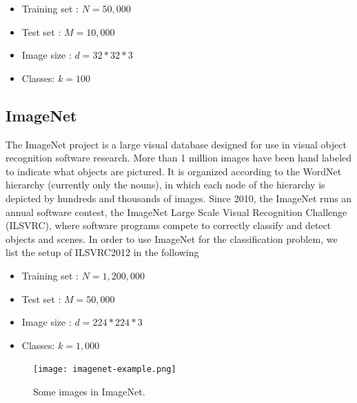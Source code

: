 {\begin{itemize}
	\item Training set : $N = 50,000$
	\item Test set : $M = 10,000$
	\item Image size : $d = 32*32*3$
	\item Classes: $k = 100$
	\end{itemize}

\subsection{ImageNet}
The ImageNet\cite{deng2009imagenet} project is a large visual database designed for use in visual object recognition software research. More than 1 million images have been hand labeled to indicate what objects are pictured. It is organized according to the WordNet hierarchy (currently only the nouns), in which each node of the hierarchy is depicted by hundreds and thousands of images.
Since 2010, the ImageNet runs an annual software contest, the ImageNet Large Scale Visual Recognition Challenge (ILSVRC), where software programs compete to correctly classify and detect objects and scenes. In order to use ImageNet for the classification problem, we list the setup of ILSVRC2012 in the following
\begin{itemize}
	\item Training set : $N = 1,200,000$
	\item Test set : $M = 50,000$
	\item Image size : $d = 224*224*3$
	\item Classes: $k = 1,000$
\end{itemize}
%		


\begin{figure}[H]
	\begin{center}
\texttt{[image: imagenet-example.png]}
		\caption{Some images in ImageNet.}
	\end{center}
\end{figure}


}
